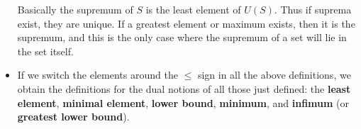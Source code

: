 \documentclass[../real_analysis.tex]{subfiles}
\begin{document}
\begin{definition}
\begin{itemize}
                Basically the supremum of $S$ is the least element of $U(S)$. Thus if suprema exist, they are unique. If a greatest element or maximum exists, then it is the supremum, and this is the only case where the supremum of a set will lie in the set itself.
                \item If we switch the elements around the $\leq$ sign in all the above definitions, we obtain the definitions for the dual notions of all those just defined: the \textbf{least element}, \textbf{minimal element}, \textbf{lower bound}, \textbf{minimum}, and \textbf{infimum} (or \textbf{greatest lower bound}).
            \end{itemize}
        \end{definition}


\end{document}
